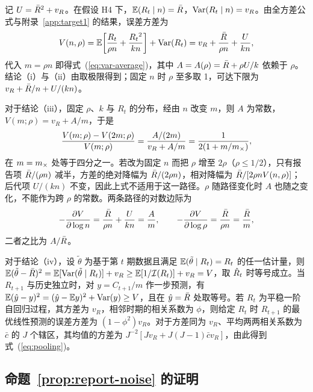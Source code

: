 记 $U=\bar{R}^2+v_R$。在假设 H4 下，$\mathbb{E}(R_t\mid n)=\bar{R}$，$\mathrm{Var}(R_t\mid n)=v_R$。由全方差公式与附录~\ref{app:target1} 的结果，误差方差为
\begin{equation}
  V(n,\rho)=\mathbb{E}\!\left[\frac{R_t}{\rho n}+\frac{R_t{}^2}{kn}\right]+\mathrm{Var}(R_t)=v_R+\frac{\bar{R}}{\rho n}+\frac{U}{kn},
\end{equation}
代入 $m=\rho n$ 即得式~(\ref{eq:var-average})，其中 $A=A(\rho)=\bar{R}+\rho U/k$ 依赖于 $\rho$。结论（i）与（ii）由取极限得到；固定 $n$ 时 $\rho$ 至多取 1，可达下限为 $v_R+\bar{R}/n+U/(kn)$。

对于结论（iii），固定 $\rho$、$k$ 与 $R_t$ 的分布，经由 $n$ 改变 $m$，则 $A$ 为常数，$V(m;\rho)=v_R+A/m$，于是
\begin{equation}
  \frac{V(m;\rho)-V(2m;\rho)}{V(m;\rho)}=\frac{A/(2m)}{v_R+A/m}=\frac{1}{2(1+m/m_{\times})},
\end{equation}
在 $m=m_{\times}$ 处等于四分之一。若改为固定 $n$ 而把 $\rho$ 增至 $2\rho$（$\rho\le1/2$），只有报告项 $\bar{R}/(\rho n)$ 减半，方差的绝对降幅为 $\bar{R}/(2\rho n)$，相对降幅为 $\bar{R}/[2\rho nV(n,\rho)]$；后代项 $U/(kn)$ 不变，因此上式不适用于这一路径。$\rho$ 随路径变化时 $A$ 也随之变化，不能作为跨 $\rho$ 的常数。两条路径的对数边际为
\begin{equation}
  -\frac{\partial V}{\partial\log n}=\frac{\bar{R}}{\rho n}+\frac{U}{kn}=\frac{A}{m},\qquad
  -\frac{\partial V}{\partial\log\rho}=\frac{\bar{R}}{\rho n}=\frac{\bar{R}}{m},
\end{equation}
二者之比为 $A/\bar{R}$。

对于结论（iv），设 $\tilde{\theta}$ 为基于第 $t$ 期数据且满足 $\mathbb{E}(\tilde{\theta}\mid R_t)=R_t$ 的任一估计量，则 $\mathbb{E}(\tilde{\theta}-\bar{R})^2=\mathbb{E}[\mathrm{Var}(\tilde{\theta}\mid R_t)]+v_R\ge\mathbb{E}[1/\mathcal{I}(R_t)]+v_R=V$，取 $\hat{R}_t$ 时等号成立。当 $R_{t+1}$ 与历史独立时，对 $y=C_{t+1}/m$ 作一步预测，有 $\mathbb{E}(\hat{y}-y)^2=(\hat{y}-\mathbb{E} y)^2+\mathrm{Var}(y)\ge V$，且在 $\hat{y}=\bar{R}$ 处取等号。若 $R_t$ 为平稳一阶自回归过程，其方差为 $v_R$，相邻时期的相关系数为 $\phi$，则给定 $R_t$ 时 $R_{t+1}$ 的最优线性预测的误差方差为 $(1-\phi^2)v_R$\citep{hamilton1994time}。对于方差同为 $v_R$、平均两两相关系数为 $\bar{c}$ 的 $J$ 个辖区，其均值的方差为 $J^{-2}[Jv_R+J(J-1)\bar{c}v_R]$，由此得到式~(\ref{eq:pooling})。

\subsection{命题~\ref{prop:report-noise} 的证明}
\label{app:prop2}

